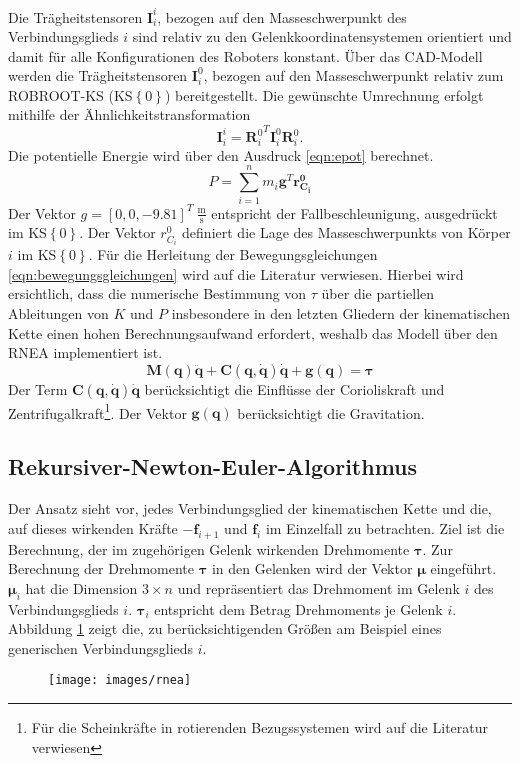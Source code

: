 Die Trägheitstensoren $\bm{I}^{i}_{i}$, bezogen auf den Masseschwerpunkt des Verbindungsglieds $i$ sind relativ zu den Gelenkkoordinatensystemen orientiert und damit für alle Konfigurationen des Roboters konstant. 
Über das CAD-Modell werden die Trägheitstensoren $\bm{I}^{0}_{i}$, bezogen auf den Masseschwerpunkt relativ zum ROBROOT-KS (KS$\left\{0\right\}$) bereitgestellt. Die gewünschte Umrechnung erfolgt mithilfe der Ähnlichkeitstransformation 
%
\begin{equation}
	\label{eqn:similarity}
	\bm{I}^{i}_{i} = {\bm{R}^{0}_i}^T \bm{I}^{0}_{i} \bm{R}^0_i.
\end{equation}
%
Die potentielle Energie wird über den Ausdruck \ref{eqn:epot} berechnet.
%
\begin{equation}
	\label{eqn:epot}
	P = \sum_{i=1}^{n} m_i \bm{g}^T\bm{r^0_{C_i}}
\end{equation}
%
Der Vektor $g = [0,0,-9.81]^T~\frac{\text{m}}{\text{s}}$ entspricht der Fallbeschleunigung, ausgedrückt im KS$\left\{0\right\}$. Der Vektor $r^0_{C_i}$ definiert die Lage des Masseschwerpunkts von Körper $i$ im  KS$\left\{0\right\}$. Für die Herleitung der Bewegungsgleichungen \ref{eqn:bewegungsgleichungen} wird auf die Literatur \autocite[S.~180 ff.]{Spong.2020} verwiesen. Hierbei wird ersichtlich, dass die numerische Bestimmung von $\tau$ über die partiellen Ableitungen von $K$ und $P$ insbesondere in den letzten Gliedern der kinematischen Kette einen hohen Berechnungsaufwand erfordert, weshalb das Modell über den RNEA implementiert ist. 
%
\begin{equation}
	\label{eqn:bewegungsgleichungen}
	\bm{M}(\bm{q})\ddot{\bm{q}} + \bm{C}(\bm{q},\dot{\bm{q}})\dot{\bm{q}} + \bm{g}(\bm{q}) = \bm{\tau}
\end{equation}
%
Der Term $\bm{C}(\bm{q},\dot{\bm{q}})\dot{\bm{q}}$ berücksichtigt die Einflüsse der Corioliskraft und Zentrifugalkraft\footnote{Für die Scheinkräfte in rotierenden Bezugssystemen wird auf die Literatur ~\autocite[S.~159]{Roth.2016} verwiesen}. Der Vektor $\bm{g}(\bm{q})$ berücksichtigt die Gravitation.
%
\subsection{Rekursiver-Newton-Euler-Algorithmus}
%
Der Ansatz sieht vor, jedes Verbindungsglied der kinematischen Kette und die, auf dieses wirkenden Kräfte $ -\boldsymbol{f}_{i+1} $ und $ \boldsymbol{f}_i $ im Einzelfall zu betrachten. Ziel ist die Berechnung, der im zugehörigen Gelenk wirkenden Drehmomente $\bm{\tau}$. Zur Berechnung der Drehmomente $\bm{\tau}$ in den Gelenken wird der Vektor $\bm{\mu}$ eingeführt. $\bm{\mu}_i$ hat die Dimension $3 \times n$ und repräsentiert das Drehmoment im Gelenk $i$ des Verbindungsglieds $i$. $\bm{\tau}_i$ entspricht dem Betrag Drehmoments je Gelenk $i$. Abbildung \ref{fig:rnea} zeigt die, zu berücksichtigenden Größen am Beispiel eines generischen Verbindungsglieds $i$.
%
\begin{figure}[tbph]
	\centering
	\texttt{[image: images/rnea]}
	\caption{\cite[S.~283]{Siciliano.2011}}
	\label{fig:rnea}
\end{figure} 
%
